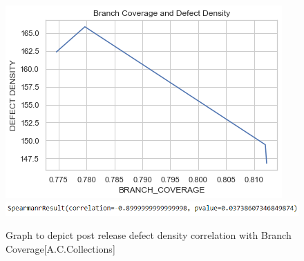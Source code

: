 \documentclass[letterpaper, 12 pt, conference]{ieeetran}  %
\begin{document}
\begin{figure}[H]
    \includegraphics[scale=0.60]{metric2 vs 6 commons-collections.png}%
    \\ \includegraphics[scale=0.60]{metric2 vs 6 commons-collections_spearmanr.png} %
    \caption{Graph to depict post release defect density correlation with Branch Coverage{\footnotesize[A.C.Collections]}}
 \end{figure}
\smallskip
\end{document}
